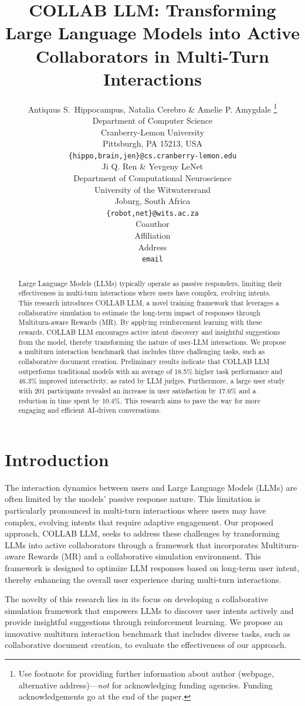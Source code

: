 \documentclass{article} %
\title{COLLAB LLM: Transforming Large Language Models into Active Collaborators in Multi-Turn Interactions}
\author{Antiquus S.~Hippocampus, Natalia Cerebro \& Amelie P. Amygdale \thanks{ Use footnote for providing further information
about author (webpage, alternative address)---\emph{not} for acknowledging
funding agencies.  Funding acknowledgements go at the end of the paper.} \\
Department of Computer Science\\
Cranberry-Lemon University\\
Pittsburgh, PA 15213, USA \\
\texttt{\{hippo,brain,jen\}@cs.cranberry-lemon.edu} \\
\And
Ji Q. Ren \& Yevgeny LeNet \\
Department of Computational Neuroscience \\
University of the Witwatersrand \\
Joburg, South Africa \\
\texttt{\{robot,net\}@wits.ac.za} \\
\AND
Coauthor \\
Affiliation \\
Address \\
\texttt{email}
}
\begin{document}
\maketitle

\begin{abstract}
Large Language Models (LLMs) typically operate as passive responders, limiting their effectiveness in multi-turn interactions where users have complex, evolving intents. This research introduces COLLAB LLM, a novel training framework that leverages a collaborative simulation to estimate the long-term impact of responses through Multiturn-aware Rewards (MR). By applying reinforcement learning with these rewards, COLLAB LLM encourages active intent discovery and insightful suggestions from the model, thereby transforming the nature of user-LLM interactions. We propose a multiturn interaction benchmark that includes three challenging tasks, such as collaborative document creation. Preliminary results indicate that COLLAB LLM outperforms traditional models with an average of 18.5\% higher task performance and 46.3\% improved interactivity, as rated by LLM judges. Furthermore, a large user study with 201 participants revealed an increase in user satisfaction by 17.6\% and a reduction in time spent by 10.4\%. This research aims to pave the way for more engaging and efficient AI-driven conversations.
\end{abstract}

\section{Introduction}
\label{sec:intro}
The interaction dynamics between users and Large Language Models (LLMs) are often limited by the models' passive response nature. This limitation is particularly pronounced in multi-turn interactions where users may have complex, evolving intents that require adaptive engagement. Our proposed approach, COLLAB LLM, seeks to address these challenges by transforming LLMs into active collaborators through a framework that incorporates Multiturn-aware Rewards (MR) and a collaborative simulation environment. This framework is designed to optimize LLM responses based on long-term user intent, thereby enhancing the overall user experience during multi-turn interactions.

The novelty of this research lies in its focus on developing a collaborative simulation framework that empowers LLMs to discover user intents actively and provide insightful suggestions through reinforcement learning. We propose an innovative multiturn interaction benchmark that includes diverse tasks, such as collaborative document creation, to evaluate the effectiveness of our approach.
\end{document}
